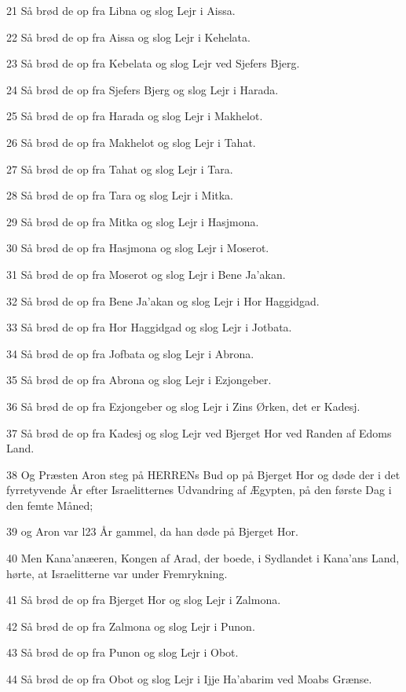 \par 21 Så brød de op fra Libna og slog Lejr i Aissa.
\par 22 Så brød de op fra Aissa og slog Lejr i Kehelata.
\par 23 Så brød de op fra Kebelata og slog Lejr ved Sjefers Bjerg.
\par 24 Så brød de op fra Sjefers Bjerg og slog Lejr i Harada.
\par 25 Så brød de op fra Harada og slog Lejr i Makhelot.
\par 26 Så brød de op fra Makhelot og slog Lejr i Tahat.
\par 27 Så brød de op fra Tahat og slog Lejr i Tara.
\par 28 Så brød de op fra Tara og slog Lejr i Mitka.
\par 29 Så brød de op fra Mitka og slog Lejr i Hasjmona.
\par 30 Så brød de op fra Hasjmona og slog Lejr i Moserot.
\par 31 Så brød de op fra Moserot og slog Lejr i Bene Ja'akan.
\par 32 Så brød de op fra Bene Ja'akan og slog Lejr i Hor Haggidgad.
\par 33 Så brød de op fra Hor Haggidgad og slog Lejr i Jotbata.
\par 34 Så brød de op fra Jofbata og slog Lejr i Abrona.
\par 35 Så brød de op fra Abrona og slog Lejr i Ezjongeber.
\par 36 Så brød de op fra Ezjongeber og slog Lejr i Zins Ørken, det er Kadesj.
\par 37 Så brød de op fra Kadesj og slog Lejr ved Bjerget Hor ved Randen af Edoms Land.
\par 38 Og Præsten Aron steg på HERRENs Bud op på Bjerget Hor og døde der i det fyrretyvende År efter Israelitternes Udvandring af Ægypten, på den første Dag i den femte Måned;
\par 39 og Aron var l23 År gammel, da han døde på Bjerget Hor.
\par 40 Men Kana'anæeren, Kongen af Arad, der boede, i Sydlandet i Kana'ans Land, hørte, at Israelitterne var under Fremrykning.
\par 41 Så brød de op fra Bjerget Hor og slog Lejr i Zalmona.
\par 42 Så brød de op fra Zalmona og slog Lejr i Punon.
\par 43 Så brød de op fra Punon og slog Lejr i Obot.
\par 44 Så brød de op fra Obot og slog Lejr i Ijje Ha'abarim ved Moabs Grænse.
